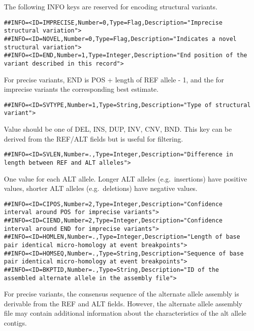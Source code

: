 \documentclass[8pt]{article}
\begin{document}
The following INFO keys are reserved for encoding structural variants.
\footnotesize
\begin{verbatim}
##INFO=<ID=IMPRECISE,Number=0,Type=Flag,Description="Imprecise structural variation">
##INFO=<ID=NOVEL,Number=0,Type=Flag,Description="Indicates a novel structural variation">
##INFO=<ID=END,Number=1,Type=Integer,Description="End position of the variant described in this record">
\end{verbatim}
\normalsize
For precise variants, END is POS + length of REF allele - 1, and the for imprecise variants the corresponding best estimate.
\footnotesize
\begin{verbatim}
##INFO=<ID=SVTYPE,Number=1,Type=String,Description="Type of structural variant">
\end{verbatim}
\normalsize
Value should be one of DEL, INS, DUP, INV, CNV, BND. This key can be derived from the REF/ALT fields but is useful for filtering.
\footnotesize
\begin{verbatim}
##INFO=<ID=SVLEN,Number=.,Type=Integer,Description="Difference in length between REF and ALT alleles">
\end{verbatim}
\normalsize
One value for each ALT allele. Longer ALT alleles (e.g.\ insertions) have positive values, shorter ALT alleles (e.g.\ deletions) have negative values.
\footnotesize
\begin{verbatim}
##INFO=<ID=CIPOS,Number=2,Type=Integer,Description="Confidence interval around POS for imprecise variants">
##INFO=<ID=CIEND,Number=2,Type=Integer,Description="Confidence interval around END for imprecise variants">
##INFO=<ID=HOMLEN,Number=.,Type=Integer,Description="Length of base pair identical micro-homology at event breakpoints">
##INFO=<ID=HOMSEQ,Number=.,Type=String,Description="Sequence of base pair identical micro-homology at event breakpoints">
##INFO=<ID=BKPTID,Number=.,Type=String,Description="ID of the assembled alternate allele in the assembly file">
\end{verbatim}
\normalsize
For precise variants, the consensus sequence of the alternate allele assembly is derivable from the REF and ALT fields. However, the alternate allele assembly file may contain additional information about the characteristics of the alt allele contigs.
\footnotesize
\end{document}
